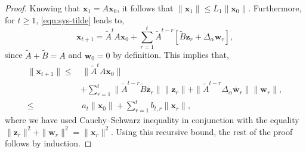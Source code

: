 \documentclass[journal]{IEEEtran}
\newtheorem{theorem}{Theorem}
\theoremstyle{definition}
\theoremstyle{remark}
\newcommand\x{{\bm x}}
\newcommand\z{{\bm z}}
\newcommand\w{{\bm w}}
\begin{document}
	\begin{proof}
		Knowing that $\x_1= A \x_0$, it follows that $\|\x_1\| \leq L_1 \|\x_0\|$.
		Furthermore, for $t\geq 1$, \cref{eqn:sys-tilde} leads to,
		\begin{equation*}
    		\textstyle \x_{t+1}=\widetilde{A}^{t} A \x_0 + \sum_{r=1}^{t}
    		\widetilde{A}^{t-r} \left[\widetilde{B} \z_r + \Delta_\alpha \w_r\right],
		\end{equation*}
		since $\widetilde{A} + \widetilde{B} = A$ and $\w_0=0$ by definition.
		This implies that,
		\begin{align*}
    		\|\x_{t+1}\| 
    		\leq & \, \|\widetilde{A}^{t} A \x_0\| \\
    		&\textstyle + \sum_{r=1}^{t} \|\widetilde{A}^{t-r} \widetilde{B} \overline{\z}_r\|\|\z_r\| + \|\widetilde{A}^{t-r} \Delta_\alpha \overline{\w}_r\|\|\w_r\|,\\
    		\leq & \textstyle  \, a_t \|\x_0\| + \sum_{r=1}^{t} b_{t,r} \|\x_r\|,
		\end{align*}
		where we have used Cauchy–Schwarz inequality in conjunction with the equality $\|\z_r\|^2 + \|\w_r\|^2 = \|\x_r\|^2$.
		Using this recursive bound, the rest of the proof follows by induction.
	\end{proof}
\end{document}
